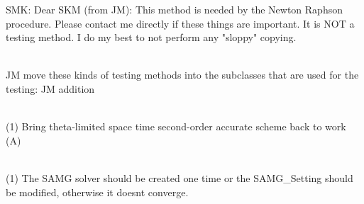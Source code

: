 \begin{DoxyRefList}
\label{todo__todo000097}%
%
SMK\+: Dear SKM (from JM)\+: This method is needed by the Newton Raphson procedure. Please contact me directly if these things are important. It is NOT a testing method. I do my best to not perform any "{}sloppy"{} copying.  
\item[Member \doxylink{classcsmp_1_1_node_centered_finite_volume_algorithm_ae87a51acb36726ba4cbe9da909e0518b}{csmp\+::Node\+Centered\+Finite\+Volume\+Algorithm\texorpdfstring{$<$}{<} dim \texorpdfstring{$>$}{>}\+::Output\+Results\+With\+L2\+Norm\+Res} (const \doxylink{classcsmp_1_1_property_database}{Property\+Database$<$ dim $>$} \&, const \doxylink{structcsmp_1_1_index}{csmp\+::\+Index} \&adv\+\_\+key, bool show\+\_\+range) const]\hfill \\
\label{todo__todo000095}%
%
JM move these kinds of testing methods into the subclasses that are used for the testing\+: JM addition  
\item[Class \doxylink{classcsmp_1_1_node_centered_finite_volume_transport}{csmp\+::Node\+Centered\+Finite\+Volume\+Transport\texorpdfstring{$<$}{<} dim \texorpdfstring{$>$}{>}} ]\hfill \\
\label{todo__todo000037}%
%
(1) Bring theta-\/limited space time second-\/order accurate scheme back to work (A)  
\item[Member \doxylink{classcsmp_1_1_node_centered_finite_volume_transport_ad979521202f91de51ac610ec07485654}{csmp\+::Node\+Centered\+Finite\+Volume\+Transport\texorpdfstring{$<$}{<} dim \texorpdfstring{$>$}{>}\+::Advect\+Variable} (double time\+\_\+interval, double cfl\+\_\+multiplication\+\_\+factor=1., bool apply\+\_\+flux\+\_\+balance\+\_\+correction=true, bool update\+\_\+pore\+\_\+volumes=false)]\hfill \\
\label{todo__todo000099}%
%
(1) The SAMG solver should be created one time or the SAMG\+\_\+\+Setting should be modified, otherwise it doesn\textquotesingle{}t converge.  
\item[Member \doxylink{classcsmp_1_1_node_centered_finite_volume_transport_ac37b4d828c5e36ed87d40edebb6b1427}{csmp\+::Node\+Centered\+Finite\+Volume\+Transport\texorpdfstring{$<$}{<} dim \texorpdfstring{$>$}{>}\+::Advect\+Variable2nd\+Order} (\doxylink{classcsmp_1_1_node_centered_finite_volume_algorithm}{Node\+Centered\+Finite\+Volume\+Algorithm$<$ dim $>$} \&, double time\+\_\+increment, bool with\+\_\+flux\+\_\+balance\+\_\+correction)]\hfill \\

\end{DoxyRefList}
